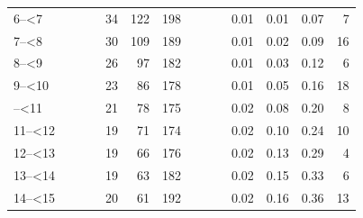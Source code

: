 \documentclass[]{elsarticle} %
\begin{document}
\begin{table}[H]
\begin{tabular}[t]{l>{}r>{}r>{}rrrr>{}r>{}r>{}rrrrr}
6--<7 & \cellcolor[HTML]{ececec}{0.04} & \cellcolor[HTML]{ececec}{0.07} & \cellcolor[HTML]{ececec}{0.37} & 34 & 122 & 198 & \cellcolor[HTML]{ececec}{0.25} & \cellcolor[HTML]{ececec}{0.50} & \cellcolor[HTML]{ececec}{2.78} & 0.01 & 0.01 & 0.07 & 7\\
7--<8 & \cellcolor[HTML]{ececec}{0.04} & \cellcolor[HTML]{ececec}{0.11} & \cellcolor[HTML]{ececec}{0.49} & 30 & 109 & 189 & \cellcolor[HTML]{ececec}{0.32} & \cellcolor[HTML]{ececec}{0.85} & \cellcolor[HTML]{ececec}{3.81} & 0.01 & 0.02 & 0.09 & 16\\
8--<9 & \cellcolor[HTML]{ececec}{0.04} & \cellcolor[HTML]{ececec}{0.17} & \cellcolor[HTML]{ececec}{0.66} & 26 & 97 & 182 & \cellcolor[HTML]{ececec}{0.42} & \cellcolor[HTML]{ececec}{1.44} & \cellcolor[HTML]{ececec}{5.13} & 0.01 & 0.03 & 0.12 & 6\\
9--<10 & \cellcolor[HTML]{ececec}{0.04} & \cellcolor[HTML]{ececec}{0.26} & \cellcolor[HTML]{ececec}{0.86} & 23 & 86 & 178 & \cellcolor[HTML]{ececec}{0.53} & \cellcolor[HTML]{ececec}{2.27} & \cellcolor[HTML]{ececec}{6.72} & 0.01 & 0.05 & 0.16 & 18\\
\addlinespace
10--<11 & \cellcolor[HTML]{ececec}{0.04} & \cellcolor[HTML]{ececec}{0.36} & \cellcolor[HTML]{ececec}{1.07} & 21 & 78 & 175 & \cellcolor[HTML]{ececec}{0.64} & \cellcolor[HTML]{ececec}{3.27} & \cellcolor[HTML]{ececec}{8.53} & 0.02 & 0.08 & 0.20 & 8\\
11--<12 & \cellcolor[HTML]{ececec}{0.03} & \cellcolor[HTML]{ececec}{0.45} & \cellcolor[HTML]{ececec}{1.25} & 19 & 71 & 174 & \cellcolor[HTML]{ececec}{0.75} & \cellcolor[HTML]{ececec}{4.35} & \cellcolor[HTML]{ececec}{10.40} & 0.02 & 0.10 & 0.24 & 10\\
12--<13 & \cellcolor[HTML]{ececec}{0.03} & \cellcolor[HTML]{ececec}{0.52} & \cellcolor[HTML]{ececec}{1.38} & 19 & 66 & 176 & \cellcolor[HTML]{ececec}{0.84} & \cellcolor[HTML]{ececec}{5.37} & \cellcolor[HTML]{ececec}{12.23} & 0.02 & 0.13 & 0.29 & 4\\
13--<14 & \cellcolor[HTML]{ececec}{0.04} & \cellcolor[HTML]{ececec}{0.55} & \cellcolor[HTML]{ececec}{1.46} & 19 & 63 & 182 & \cellcolor[HTML]{ececec}{0.91} & \cellcolor[HTML]{ececec}{6.24} & \cellcolor[HTML]{ececec}{13.89} & 0.02 & 0.15 & 0.33 & 6\\
14--<15 & \cellcolor[HTML]{ececec}{0.05} & \cellcolor[HTML]{ececec}{0.56} & \cellcolor[HTML]{ececec}{1.49} & 20 & 61 & 192 & \cellcolor[HTML]{ececec}{0.96} & \cellcolor[HTML]{ececec}{6.89} & \cellcolor[HTML]{ececec}{15.32} & 0.02 & 0.16 & 0.36 & 13\\

\end{tabular}
\end{table}
\end{document}
